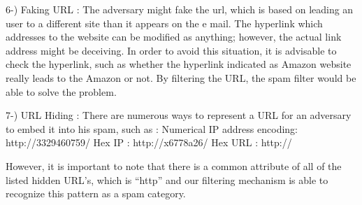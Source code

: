 6-) Faking URL : The adversary might fake the url, which is based on leading an user to a different site than it appears on the e mail. The hyperlink which addresses to the website can be modified as anything; however, the actual link address might be deceiving. In order to avoid this situation, it is advisable to check the hyperlink, such as whether the hyperlink indicated as Amazon website really leads to the Amazon or not. By filtering the URL, the spam filter would be able to solve the problem. 

7-) URL Hiding : There are numerous ways to represent a URL for an adversary to embed it into his spam, such as :
Numerical IP address encoding: http://3329460759/ 
Hex IP : http://x6778a26/ 
Hex URL : http://%

However, it is important to note that there is a common attribute of all of the listed hidden URL’s, which is “http” and our filtering mechanism is able to recognize this pattern as a spam category. 



